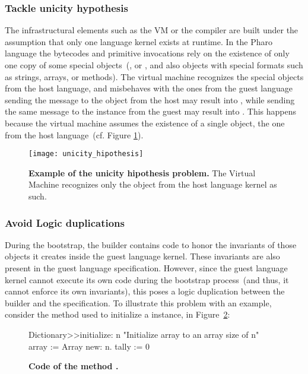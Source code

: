 \subsubsection{Tackle unicity hypothesis}
The infrastructural elements such as the VM or the compiler are built under the assumption that only one language kernel exists at runtime.
In the Pharo language the bytecodes and primitive invocations rely on the existence of only one copy of some special objects~(\eg {},  or , and also objects with special formats such as strings, arrays, or methods). The virtual machine recognizes the special objects from the host language, and misbehaves with the ones from the guest language \eg sending the  message to the  object from the host may result into , while sending the same message to the  instance from the guest may result into . This happens because the virtual machine assumes the existence of a single  object, the one from the host language~(cf. Figure \ref{fig:unicity_hipothesis}).

\begin{figure}[ht]
\center
\texttt{[image: unicity\_hipothesis]}
\caption{\textbf{Example of the unicity hipothesis problem.} The Virtual Machine recognizes only the  object from the host language kernel as such. \label{fig:unicity_hipothesis}}
\end{figure}


\subsubsection{Avoid Logic duplications} During the bootstrap, the builder contains code to honor the invariants of those objects it creates inside the guest language kernel. These invariants are also present in the guest language specification. However, since the guest language kernel cannot execute its own code during the bootstrap process~(and thus, it cannot enforce its own invariants), this poses a logic duplication between the builder and the specification. To illustrate this problem with an example, consider the method  used to initialize a  instance, in Figure~\ref{code:logic_dup}:

\begin{figure}[ht]
\begin{code}
Dictionary>>initialize: n
    "Initialize array to an array size of n"
    array := Array new: n.
    tally := 0
\end{code}
\caption{\textbf{Code of the method .}\label{code:logic_dup}}
\end{figure}

